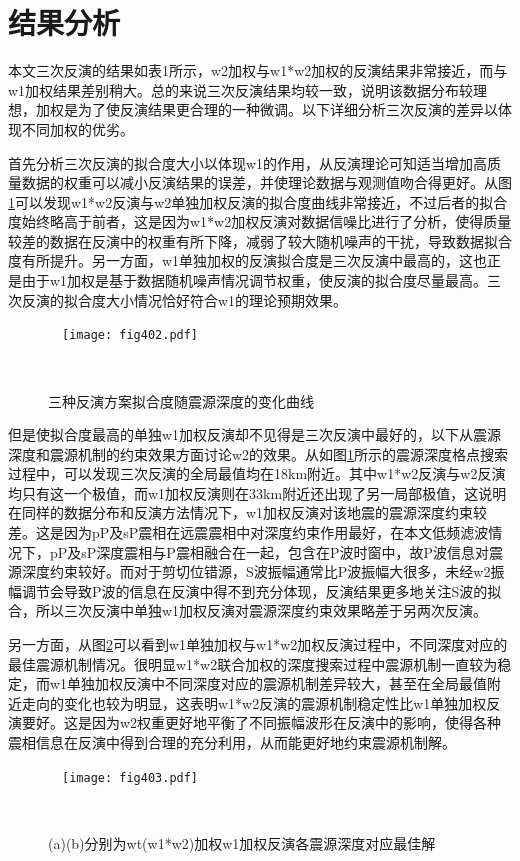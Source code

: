 \section{结果分析}

本文三次反演的结果如表1所示，w2加权与w1*w2加权的反演结果非常接近，而与w1加权结果差别稍大。总的来说三次反演结果均较一致，说明该数据分布较理想，加权是为了使反演结果更合理的一种微调。以下详细分析三次反演的差异以体现不同加权的优劣。

首先分析三次反演的拟合度大小以体现w1的作用，从反演理论可知适当增加高质量数据的权重可以减小反演结果的误差，并使理论数据与观测值吻合得更好。从图\ref{fig402}可以发现w1*w2反演与w2单独加权反演的拟合度曲线非常接近，不过后者的拟合度始终略高于前者，这是因为w1*w2加权反演对数据信噪比进行了分析，使得质量较差的数据在反演中的权重有所下降，减弱了较大随机噪声的干扰，导致数据拟合度有所提升。另一方面，w1单独加权的反演拟合度是三次反演中最高的，这也正是由于w1加权是基于数据随机噪声情况调节权重，使反演的拟合度尽量最高。三次反演的拟合度大小情况恰好符合w1的理论预期效果。
\begin{figure}
\centering
  \texttt{[image: fig402.pdf]}
  \caption{三种反演方案拟合度随震源深度的变化曲线}
  \label{fig402}
\end{figure}

但是使拟合度最高的单独w1加权反演却不见得是三次反演中最好的，以下从震源深度和震源机制的约束效果方面讨论w2的效果。从如图\ref{fig402}所示的震源深度格点搜索过程中，可以发现三次反演的全局最值均在18km附近。其中w1*w2反演与w2反演均只有这一个极值，而w1加权反演则在33km附近还出现了另一局部极值，这说明在同样的数据分布和反演方法情况下，w1加权反演对该地震的震源深度约束较差。这是因为pP及sP震相在远震震相中对深度约束作用最好，在本文低频滤波情况下，pP及sP深度震相与P震相融合在一起，包含在P波时窗中，故P波信息对震源深度约束较好。而对于剪切位错源，S波振幅通常比P波振幅大很多，未经w2振幅调节会导致P波的信息在反演中得不到充分体现，反演结果更多地关注S波的拟合，所以三次反演中单独w1加权反演对震源深度约束效果略差于另两次反演。

另一方面，从图\ref{fig403}可以看到w1单独加权与w1*w2加权反演过程中，不同深度对应的最佳震源机制情况。很明显w1*w2联合加权的深度搜索过程中震源机制一直较为稳定，而w1单独加权反演中不同深度对应的震源机制差异较大，甚至在全局最值附近走向的变化也较为明显，这表明w1*w2反演的震源机制稳定性比w1单独加权反演要好。这是因为w2权重更好地平衡了不同振幅波形在反演中的影响，使得各种震相信息在反演中得到合理的充分利用，从而能更好地约束震源机制解。
\begin{figure}
\centering
  \texttt{[image: fig403.pdf]}
  \caption{ (a)(b)分别为wt(w1*w2)加权w1加权反演各震源深度对应最佳解}
  \label{fig403}
\end{figure}


